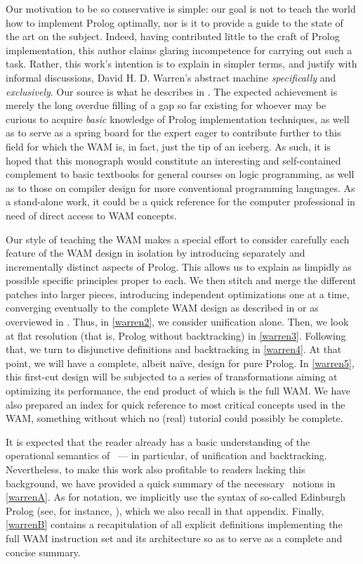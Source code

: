 Our motivation to be so conservative is simple: our goal is not to teach the
world how to implement Prolog optimally, nor is it to provide a guide to the
state of the art on the subject. Indeed, having contributed little to the craft
of Prolog implementation, this author claims glaring incompetence for carrying
out such a task. Rather, this work’s intention is to explain in simpler terms,
and justify with informal discussions, David H. D. Warren’s abstract machine
\emph{specifically} and \emph{exclusively}. Our source is what he describes in
\cite{War83, War88}. The expected achievement is merely the long overdue filling
of a gap so far existing for whoever may be curious to acquire \emph{basic}
knowledge of Prolog implementation techniques, as well as to serve as a spring
board for the expert eager to contribute further to this field for which the WAM
is, in fact, just the tip of an iceberg. As such, it is hoped that this
monograph would constitute an interesting and self-contained complement to basic
textbooks for general courses on logic programming, as well as to those on
compiler design for more conventional programming languages. As a stand-alone
work, it could be a quick reference for the computer professional in need of
direct access to WAM concepts.

Our style of teaching the WAM makes a special effort to consider carefully each
feature of the WAM design in isolation by introducing separately and
incrementally distinct aspects of Prolog. This allows us to explain as limpidly
as possible specific principles proper to each. We then stitch and merge the
different patches into larger pieces, introducing independent optimizations one
at a time, converging eventually to the complete WAM design as described in
\cite{War83} or as overviewed in \cite{War88}. Thus, in \ref{warren2}, we
consider unification alone. Then, we look at flat resolution (that is, Prolog
without backtracking) in \ref{warren3}. Following that, we turn to disjunctive
definitions and backtracking in \ref{warren4}. At that point, we will have a
complete, albeit na\"ive, design for pure Prolog. In \ref{warren5}, this
first-cut design will be subjected to a series of transformations aiming at
optimizing its performance, the end product of which is the full WAM. We have
also prepared an index for quick reference to most critical concepts used in the
WAM, something without which no (real) tutorial could possibly be complete.

It is expected that the reader already has a basic understanding of the
operational semantics of \prolog\ --- in particular, of unification and
backtracking. Nevertheless, to make this work also profitable to readers lacking
this background, we have provided a quick summary of the necessary \prolog\
notions in \ref{warrenA}. As for notation, we implicitly use the syntax of
so-called Edinburgh Prolog (see, for instance, \cite{CM84}), which we also
recall in that appendix. Finally, \ref{warrenB} contains a recapitulation of all
explicit definitions implementing the full WAM instruction set and its
architecture so as to serve as a complete and concise summary.


\secup
\secup